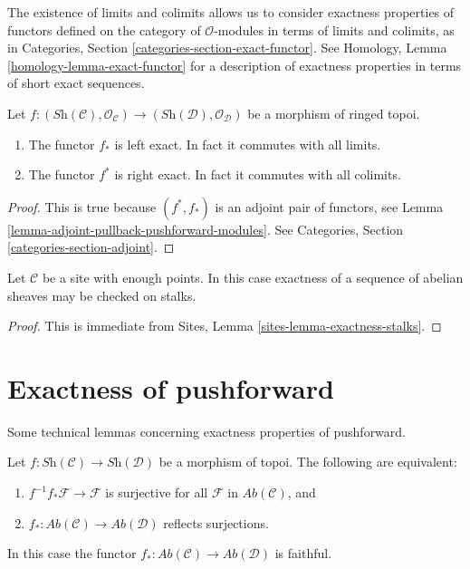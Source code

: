 \noindent
The existence of limits and colimits allows us to consider exactness
properties of functors defined on the category of $\mathcal{O}$-modules
in terms of limits and colimits, as in
Categories, Section \ref{categories-section-exact-functor}.
See Homology, Lemma \ref{homology-lemma-exact-functor} for a description of
exactness properties in terms of short exact sequences.

\begin{lemma}
\label{lemma-exactness-pushforward-pullback}
Let $f : (\textit{Sh}(\mathcal{C}), \mathcal{O}_{\mathcal{C}})
\to (\textit{Sh}(\mathcal{D}), \mathcal{O}_{\mathcal{D}})$
be a morphism of ringed topoi.
\begin{enumerate}
\item The functor $f_*$ is left exact. In fact it commutes with
all limits.
\item The functor $f^*$ is right exact. In fact it commutes
with all colimits.
\end{enumerate}
\end{lemma}

\begin{proof}
This is true because $(f^*, f_*)$ is an adjoint pair
of functors, see
Lemma \ref{lemma-adjoint-pullback-pushforward-modules}.
See Categories, Section \ref{categories-section-adjoint}.
\end{proof}

\begin{lemma}
\label{lemma-check-exactness-stalks}
Let $\mathcal{C}$ be a site with enough points.
In this case exactness of a sequence of abelian sheaves may
be checked on stalks.
\end{lemma}

\begin{proof}
This is immediate from
Sites, Lemma \ref{sites-lemma-exactness-stalks}.
\end{proof}





\section{Exactness of pushforward}
\label{section-pushforward}

\noindent
Some technical lemmas concerning exactness properties of pushforward.

\begin{lemma}
\label{lemma-reflect-surjections}
Let $f : \textit{Sh}(\mathcal{C}) \to \textit{Sh}(\mathcal{D})$ be
a morphism of topoi. The following are equivalent:
\begin{enumerate}
\item $f^{-1}f_*\mathcal{F} \to \mathcal{F}$ is surjective for
all $\mathcal{F}$ in $\textit{Ab}(\mathcal{C})$, and
\item $f_* : \textit{Ab}(\mathcal{C}) \to \textit{Ab}(\mathcal{D})$
reflects surjections.
\end{enumerate}
In this case the functor
$f_* : \textit{Ab}(\mathcal{C}) \to \textit{Ab}(\mathcal{D})$
is faithful.
\end{lemma}

